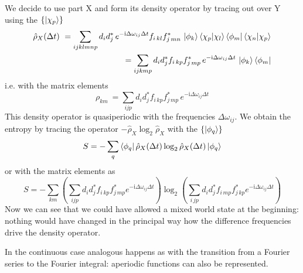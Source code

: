 \documentclass[12pt]{article}
\begin{document}
We decide to use part X and form its density operator by tracing out over Y using the $\{\ket{\chi_p}\}$
\begin{equation}
\label{eq:rho_quasiperiodic}
\begin{split}
\hat{\rho}_X(\Delta t)
\ = \sum_{ijklmnp}d_{i}d_{j}^*\, e^{-\mathrm i \Delta\omega_{ij}\Delta t} 
f_{i\,kl}f_{j\,mn}^*\, \ket{\phi_k}\bra{\chi_p}\ket{\chi_l}\bra{\phi_m}\bra{\chi_n}\ket{\chi_p}
\\
= \sum_{ijkmp}d_{i}d_{j}^* f_{i\,kp}f_{j\,mp}^*\, e^{-\mathrm i \Delta\omega_{ij}\Delta t} 
\, \ket{\phi_k}\bra{\phi_m} 
\end{split}
\end{equation}
i.e. with the matrix elements
\begin{equation}
\label{eq:rho_matrix_quasiperiodic}
\rho_{km}\ = \sum_{ijp}d_{i}d_{j}^* f_{i\,kp}f_{j\,mp}^*\, e^{-\mathrm i \Delta\omega_{ij}\Delta t} 
\end{equation}
This density operator is quasiperiodic with the frequencies $\Delta \omega_{ij}$. We obtain the entropy by tracing the operator $-\hat{\rho}_X \log_2 \hat{\rho}_X$ with the $\{\ket{\phi_q}\}$
\begin{equation}
\label{eq:S_quasiperiodic}
S = -\sum_q \bra{\phi_q} \hat{\rho}_X(\Delta t) \log_2 \hat{\rho}_X(\Delta t)  \ket{\phi_q}
\end{equation}
or with the matrix elements as
\begin{equation}
\label{eq:S_matrix_quasiperiodic}
S = -\sum_{km}\left(\sum_{ijp}d_{i}d_{j}^* f_{i\,kp}f_{j\,mp}^* e^{-\mathrm i \Delta\omega_{ij}\Delta t}\right)
\log_2 \left(\sum_{i\,jp}d_{i}d_{j}^* f_{i\,mp}f_{j\,kp}^* e^{-\mathrm i \Delta\omega_{ij}\Delta t}\right)
\end{equation}
Now we can see that we could have allowed a mixed world state at the beginning: nothing would have changed in the principal way how the difference frequencies drive the density operator.

In the continuous case analogous happens as with the transition from a Fourier series to the Fourier integral: aperiodic functions can also be represented. 
\end{document}
